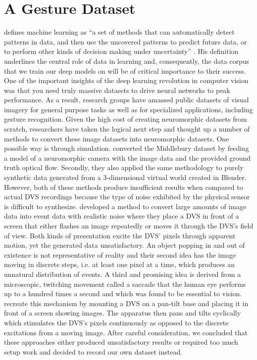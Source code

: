 \chapter{A Gesture Dataset}
\label{cha:gesture-dataset}

\citeauthor{murphy12} defines machine learning as \enquote{a set of methods that
  can automatically detect patterns in data, and then use the uncovered patterns
  to predict future data, or to perform other kinds of decision making under
  uncertainty} \cite{murphy12}. His definition underlines the central role of
data in learning and, consequently, the data corpus that we train our deep
models on will be of critical importance to their success. One of the important
insights of the deep learning revolution in computer vision was that you need
truly massive datasets to drive neural networks to peak performance. As a
result, research groups have amassed public datasets of visual imagery for
general purpose tasks as well as for specialized applications, including gesture
recognition. Given the high cost of creating neuromorphic datasets from scratch,
researchers have taken the logical next step and thought up a number of methods
to convert these image datasets into neuromorphic datasets. One possible way is
through simulation. \cite{barranco2016dataset} converted the Middlebury dataset
\cite{middlebury} by feeding a model of a neuromorphic camera with the image
data and the provided ground truth optical flow. Secondly, they also applied the
same methodology to purely synthetic data generated from a 3-dimensional virtual
world created in Blender. However, both of these methods produce insufficient
results when compared to actual DVS recordings because the type of noise
exhibited by the physical sensor is difficult to synthesize.
\cite{liu2016benchmarking} developed a method to convert large amounts of image
data into event data with realistic noise where they place a DVS in front of a
screen that either flashes an image repeatedly or moves it through the DVS's
field of view. Both kinds of presentation excite the DVS' pixels through
apparent motion, yet the generated data unsatisfactory. An object popping in and
out of existence is not representative of reality and their second idea has the
image moving in discrete steps, i.e. at least one pixel at a time, which
produces an unnatural distribution of events. A third and promising idea is
derived from a microscopic, twitching movement called a saccade that the human
eye performs up to a hundred times a second and which was found to be essential
to vision. \cite{orchard2015converting} recreate this mechanism by mounting a
DVS on a pan-tilt base and placing it in front of a screen showing images. The
apparatus then pans and tilts cyclically which stimulates the DVS's pixels
continuously as opposed to the discrete excitations from a moving image. After
careful consideration, we concluded that these approaches either produced
unsatisfactory results or required too much setup work and decided to record our
own dataset instead.

